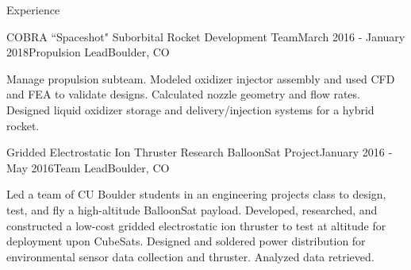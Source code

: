 \documentclass{resume} %
\begin{document}
\begin{rSection}{Experience}


\begin{rSubsection}{COBRA ``Spaceshot" Suborbital Rocket Development Team}{March 2016 - January 2018}{Propulsion Lead}{Boulder, CO}
\item {\small Manage propulsion subteam. Modeled oxidizer injector assembly and used CFD and FEA to validate designs. Calculated nozzle geometry and flow rates. Designed liquid oxidizer storage and delivery/injection systems for a hybrid rocket. } 
\end{rSubsection}






\begin{rSubsection}{Gridded Electrostatic Ion Thruster Research BalloonSat Project}{January 2016 - May 2016}{Team Lead}{Boulder, CO}
\item {\small Led a team of CU Boulder students in an engineering projects class to design, test, and fly a high-altitude BalloonSat payload. Developed, researched, and constructed a low-cost gridded electrostatic ion thruster to test at altitude for deployment upon CubeSats. Designed and soldered power distribution for environmental sensor data collection and thruster. Analyzed data retrieved.}
\end{rSubsection}


\end{rSection}
\end{document}
